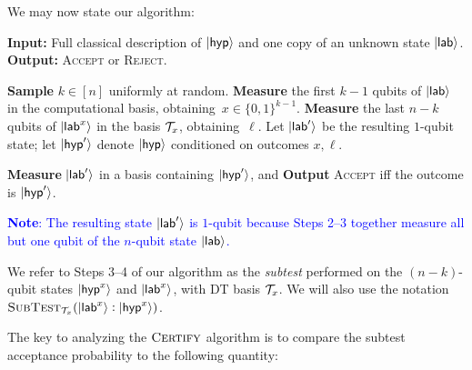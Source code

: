 We may now state our algorithm:

\begin{algorithm}[H]
    \vspace{0.3em}
    \textbf{Input:} Full classical description of $\lvert\mathsf{hyp}\rangle$ and one copy of an unknown state $\lvert\mathsf{lab}\rangle$. \\
    \textbf{Output:} \textsc{Accept} or \textsc{Reject}.
    \begin{algorithmic}[1]
    \State \textbf{Sample} $k\in[n]$ uniformly at random.
    \State \textbf{Measure} the first $k-1$ qubits of $\lvert\mathsf{lab}\rangle$ in the computational basis, obtaining~$x\in\{0,1\}^{k-1}$.    
    \State \textbf{Measure} the last $n-k$ qubits of $\lvert\mathsf{lab}^x\rangle$ in the basis $\mathcal{T}_x$, obtaining~$\ell$.
    \State Let $\lvert\mathsf{lab}'\rangle$ be the resulting $1$-qubit state; let $\lvert\mathsf{hyp}'\rangle$ denote $\lvert\mathsf{hyp}\rangle$ conditioned on outcomes $x, \ell$.
    
    \noindent \textbf{Measure} $\lvert\mathsf{lab}'\rangle$ in a basis containing $\lvert\mathsf{hyp}'\rangle$, %
    and \textbf{Output} \textsc{Accept} iff the outcome is $\lvert\mathsf{hyp}'\rangle$.
    \end{algorithmic}
    \caption{\textsc{Certify}$(\ket{\lab}, \ket{\tar})$}
    \label{alg:main}
\end{algorithm}

\textcolor{blue}{\textbf{Note}: The resulting state $\lvert\mathsf{lab}'\rangle$ is $1$-qubit because Steps 2--3 together measure all but one qubit of the $n$-qubit state $\lvert\mathsf{lab}\rangle$.} 
\begin{definition}
    We refer to Steps 3--4 of our algorithm as the \emph{subtest} performed on the \mbox{$(n-k)$}-qubit states $\lvert\mathsf{hyp}^x\rangle$ and $\lvert\mathsf{lab}^x\rangle$, with DT basis $\mathcal{T}_x$.  We will also use the notation $\textsc{SubTest}_{\mathcal{T}_x}(\lvert\mathsf{lab}^x\rangle: \lvert\smash{\mathsf{hyp}^x}\rangle)$.
\end{definition}



The key to analyzing the $\textsc{Certify}$ algorithm is to compare the subtest acceptance probability %
to the following quantity:

